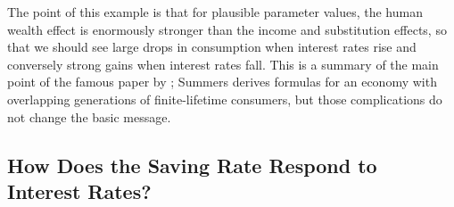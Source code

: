 \documentclass{scrartcl}
\begin{document}
The point of this example is that for plausible parameter values, the
human wealth effect is enormously stronger than the income and
substitution effects, so that we should see large drops in consumption
when interest rates rise and conversely strong gains when interest
rates fall.
This is a summary of the main point of the famous paper
by \cite{summersCapTax}; Summers derives formulas for an economy with
overlapping generations of finite-lifetime consumers, but those
complications do not change the basic message.

\subsection{How Does the Saving Rate Respond to Interest Rates?} %
\end{document}
